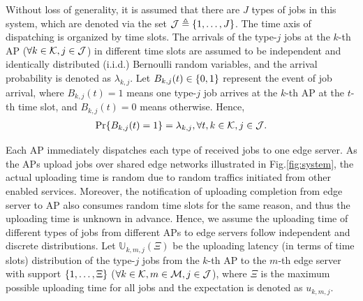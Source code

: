 Without loss of generality, it is assumed that there are $J$ types of jobs in this system, which are denoted via the set $\mathcal{J} \triangleq \{1,\dots,J\}$.
The time axis of dispatching is organized by time slots.
The arrivals of the type-$j$ jobs at the $k$-th AP ($\forall k\in\mathcal{K},j\in\mathcal{J}$) in different time slots are assumed to be independent and identically distributed (i.i.d.) Bernoulli random variables, and the arrival probability is denoted as $\lambda_{k,j}$.
Let $B_{k,j}(t) \in \{0,1\}$ represent the event of job arrival, where $B_{k,j}(t)=1$ means one type-$j$ job arrives at the $k$-th AP at the $t$-th time slot, and $B_{k,j}(t)=0$ means otherwise.
Hence,
\begin{align}
    \Pr\{ B_{k,j}(t) = 1 \} = \lambda_{k,j}, \forall t,k\in\mathcal{K},j\in\mathcal{J}.
\end{align}

Each AP immediately dispatches each type of received jobs to one edge server.
As the APs upload jobs over shared edge networks illustrated in Fig.\ref{fig:system}, the actual uploading time is random due to random traffics initiated from other enabled services.
Moreover, the notification of uploading completion from edge server to AP also consumes random time slots for the same reason, and thus the uploading time is unknown in advance.
Hence, we assume the uploading time of different types of jobs from different APs to edge servers follow independent and discrete distributions.
Let $\mathbb{U}_{k,m,j}(\Xi)$ be the uploading latency (in terms of time slots) distribution of the type-$j$ jobs from the $k$-th AP to the $m$-th edge server with support $\{1, \dots, \Xi\}$ ($\forall k\in\mathcal{K}, m\in\mathcal{M}, j\in\mathcal{J}$), where $\Xi$ is the maximum possible uploading time for all jobs and the expectation is denoted as $u_{k,m,j}$.

